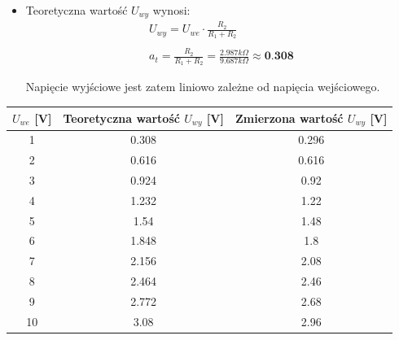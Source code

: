\begin{itemize}
    \item Teoretyczna wartość $U_{wy}$ wynosi:
    \begin{gather} \label{dzielnik_row}
        U_{wy} = U_{we} \cdot \frac{R_2}{R_1 + R_2} \\\\
        a_t = \frac{R_2}{R_1 + R_2} = \frac{2.987k\Omega}{9.687k\Omega} \approx \textbf{0.308}
    \end{gather}

    Napięcie wyjściowe jest zatem liniowo zależne od napięcia wejściowego.
\end{itemize}
\begin{center}
    \begin{tabular}{|c|c|c|}
         \hline
         $U_{we}$ [V] & Teoretyczna wartość $U_{wy}$ [V] & Zmierzona wartość $U_{wy}$ [V] \\
         \hline
         1 & 0.308 & 0.296\\
         \hline
         2 & 0.616 & 0.616\\
         \hline
         3 & 0.924 & 0.92 \\
         \hline
         4 & 1.232 & 1.22 \\
         \hline
         5 & 1.54  & 1.48 \\
         \hline
         6 & 1.848 & 1.8  \\
         \hline
         7 & 2.156 & 2.08 \\
         \hline
         8 & 2.464 & 2.46 \\
         \hline
         9 & 2.772 & 2.68 \\
         \hline
         10 & 3.08 & 2.96 \\
         \hline
    \end{tabular}
\end{center}



\begin{center}
\end{center}

